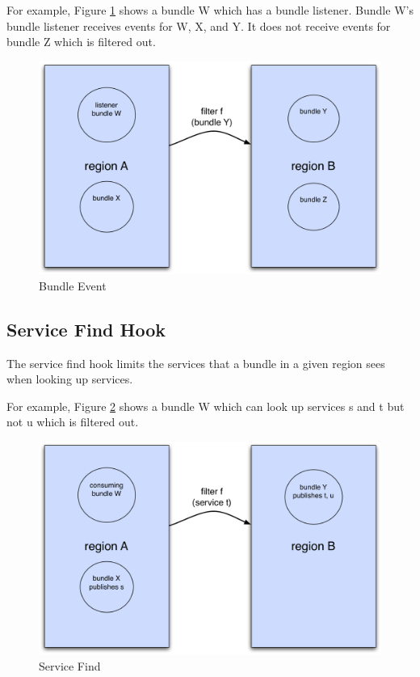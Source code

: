 \documentclass[a4paper,9pt]{article}
\begin{document}
For example, Figure \ref{fig:bevent} shows a bundle W which has a bundle listener.
Bundle W's bundle listener receives events for W, X, and Y. It does not receive events for bundle Z which is filtered out. 
\begin{figure}[h!]
\begin{center}
\includegraphics*[scale=0.4]{bundle-event.pdf}
\caption{Bundle Event \label{fig:bevent}}
\end{center}
\end{figure}

\subsection{Service Find Hook}

The service find hook limits the services that a bundle in a given region sees when looking up services.

For example, Figure \ref{fig:sfind} shows a bundle W which can look up services s and t but not u which is filtered out.
\begin{figure}[h!]
\begin{center}
\includegraphics*[scale=0.4]{service-find.pdf}
\caption{Service Find \label{fig:sfind}}
\end{center}
\end{figure}
\end{document}
